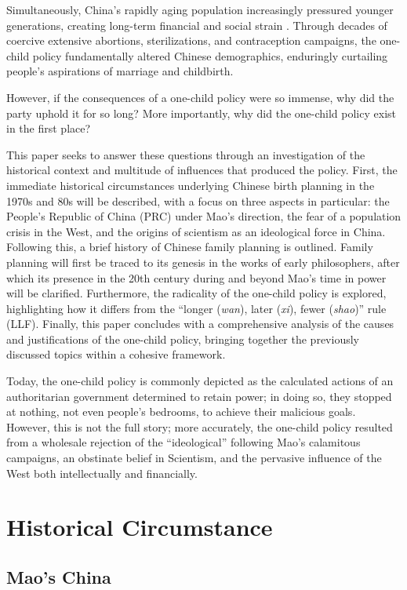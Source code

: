 Simultaneously, China’s rapidly aging population increasingly pressured younger generations, creating long-term financial and social strain \autocite[pp.\ 1429--1430]{JiangSanchezBarricarte2011}. Through decades of coercive extensive abortions, sterilizations, and contraception campaigns, the one-child policy fundamentally altered Chinese demographics, enduringly curtailing people’s aspirations of marriage and childbirth.

However, if the consequences of a one-child policy were so immense, why did the party uphold it for so long? More importantly, why did the one-child policy exist in the first place?

This paper seeks to answer these questions through an investigation of the historical context and multitude of influences that produced the policy. First, the immediate historical circumstances underlying Chinese birth planning in the 1970s and 80s will be described, with a focus on three aspects in particular: the People’s Republic of China (PRC) under Mao’s direction, the fear of a population crisis in the West, and the origins of scientism as an ideological force in China. Following this, a brief history of Chinese family planning is outlined. Family planning will first be traced to its genesis in the works of early philosophers, after which its presence in the 20th century during and beyond Mao’s time in power will be clarified. Furthermore, the radicality of the one-child policy is explored, highlighting how it differs from the “longer (\emph{wan}), later (\emph{xi}), fewer (\emph{shao})” rule (LLF). Finally, this paper concludes with a comprehensive analysis of the causes and justifications of the one-child policy, bringing together the previously discussed topics within a cohesive framework. 

Today, the one-child policy is commonly depicted as the calculated actions of an authoritarian government determined to retain power; in doing so, they stopped at nothing, not even people’s bedrooms, to achieve their malicious goals. However, this is not the full story; more accurately, the one-child policy resulted from a wholesale rejection of the “ideological” following Mao’s calamitous campaigns, an obstinate belief in Scientism, and the pervasive influence of the West both intellectually and financially.

\section{Historical Circumstance}
\subsection{Mao's China}


